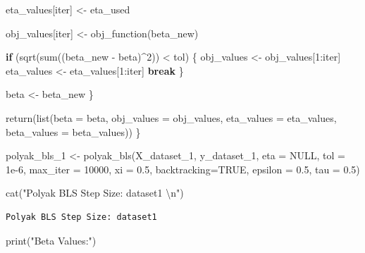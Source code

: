 \documentclass[
  letterpaper,
  DIV=11,
  numbers=noendperiod]{scrartcl}
\newenvironment{Shaded}{\begin{snugshade}}{\end{snugshade}}
\newcommand{\AttributeTok}[1]{\textcolor[rgb]{0.40,0.45,0.13}{#1}}
\newcommand{\ConstantTok}[1]{\textcolor[rgb]{0.56,0.35,0.01}{#1}}
\newcommand{\ControlFlowTok}[1]{\textcolor[rgb]{0.00,0.23,0.31}{\textbf{#1}}}
\newcommand{\DecValTok}[1]{\textcolor[rgb]{0.68,0.00,0.00}{#1}}
\newcommand{\FloatTok}[1]{\textcolor[rgb]{0.68,0.00,0.00}{#1}}
\newcommand{\FunctionTok}[1]{\textcolor[rgb]{0.28,0.35,0.67}{#1}}
\newcommand{\NormalTok}[1]{\textcolor[rgb]{0.00,0.23,0.31}{#1}}
\newcommand{\OtherTok}[1]{\textcolor[rgb]{0.00,0.23,0.31}{#1}}
\newcommand{\SpecialCharTok}[1]{\textcolor[rgb]{0.37,0.37,0.37}{#1}}
\newcommand{\StringTok}[1]{\textcolor[rgb]{0.13,0.47,0.30}{#1}}
\begin{document}
\begin{Shaded}
\begin{Highlighting}[]
\NormalTok{    eta\_values[iter] }\OtherTok{\textless{}{-}}\NormalTok{ eta\_used}
    
\NormalTok{    obj\_values[iter] }\OtherTok{\textless{}{-}} \FunctionTok{obj\_function}\NormalTok{(beta\_new)}
    
    \ControlFlowTok{if}\NormalTok{ (}\FunctionTok{sqrt}\NormalTok{(}\FunctionTok{sum}\NormalTok{((beta\_new }\SpecialCharTok{{-}}\NormalTok{ beta)}\SpecialCharTok{\^{}}\DecValTok{2}\NormalTok{)) }\SpecialCharTok{\textless{}}\NormalTok{ tol) \{}
\NormalTok{      obj\_values }\OtherTok{\textless{}{-}}\NormalTok{ obj\_values[}\DecValTok{1}\SpecialCharTok{:}\NormalTok{iter]}
\NormalTok{      eta\_values }\OtherTok{\textless{}{-}}\NormalTok{ eta\_values[}\DecValTok{1}\SpecialCharTok{:}\NormalTok{iter]}
      \ControlFlowTok{break}
\NormalTok{    \}}
    
\NormalTok{    beta }\OtherTok{\textless{}{-}}\NormalTok{ beta\_new}
\NormalTok{  \}}
  
  \FunctionTok{return}\NormalTok{(}\FunctionTok{list}\NormalTok{(}\AttributeTok{beta =}\NormalTok{ beta, }\AttributeTok{obj\_values =}\NormalTok{ obj\_values, }\AttributeTok{eta\_values =}\NormalTok{ eta\_values, }\AttributeTok{beta\_values =}\NormalTok{ beta\_values))}
\NormalTok{\}}

\NormalTok{polyak\_bls\_1 }\OtherTok{\textless{}{-}} \FunctionTok{polyak\_bls}\NormalTok{(X\_dataset\_1, y\_dataset\_1, }\AttributeTok{eta =} \ConstantTok{NULL}\NormalTok{, }\AttributeTok{tol =} \FloatTok{1e{-}6}\NormalTok{, }\AttributeTok{max\_iter =} \DecValTok{10000}\NormalTok{, }\AttributeTok{xi =} \FloatTok{0.5}\NormalTok{, }\AttributeTok{backtracking=}\ConstantTok{TRUE}\NormalTok{, }\AttributeTok{epsilon =} \FloatTok{0.5}\NormalTok{, }\AttributeTok{tau =} \FloatTok{0.5}\NormalTok{)}

\FunctionTok{cat}\NormalTok{(}\StringTok{"Polyak BLS Step Size: dataset1 }\SpecialCharTok{\textbackslash{}n}\StringTok{"}\NormalTok{)}
\end{Highlighting}
\end{Shaded}

\begin{verbatim}
Polyak BLS Step Size: dataset1 
\end{verbatim}

\begin{Shaded}
\begin{Highlighting}[]
\FunctionTok{print}\NormalTok{(}\StringTok{"Beta Values:"}\NormalTok{)}
\end{Highlighting}
\end{Shaded}
\end{document}
